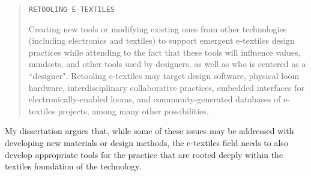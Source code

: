 \noindent\begin{minipage}{\linewidth}
\begin{quote}
  \texttt{RETOOLING E-TEXTILES}

  Creating new tools or modifying existing ones from other technologies (including electronics and textiles) to support emergent e-textiles design practices while attending to the fact that these tools will influence values, mindsets, and other tools used by designers, as well as who is centered as a ``designer". Retooling e-textiles may target design software, physical loom hardware, interdisciplinary collaborative practices, embedded interfaces for electronically-enabled looms, and community-generated databases of e-textiles projects, among many other possibilities.
\end{quote}
\vspace{1em}
\end{minipage}

My dissertation argues that, while some of these issues may be addressed with developing new materials or design methods, the e-textiles field needs to also develop appropriate tools for the practice that are rooted deeply within the textiles foundation of the technology. 



